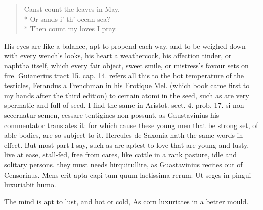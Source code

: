 {\begin{verse}
Canst count the leaves in May,\\*
Or sands i' th' ocean sea?\\*
Then count my loves I pray.
\end{verse}

His eyes are like a balance, apt to propend each way, and to be weighed
down with every wench's looks, his heart a weathercock, his affection
tinder, or naphtha itself, which every fair object, sweet smile, or
mistress's favour sets on fire. Guianerius tract 15. cap. 14. refers
all this to the hot temperature of the testicles, Ferandus a
Frenchman in his Erotique Mel. (which book came first to my hands
after the third edition) to certain atomi in the seed, such as are very
spermatic and full of seed. I find the same in Aristot. sect. 4. prob.
17. si non secernatur semen, cessare tentigines non possunt, as
Gaustavinius his commentator translates it: for which cause these young
men that be strong set, of able bodies, are so subject to it. Hercules
de Saxonia hath the same words in effect. But most part I say, such as
are aptest to love that are young and lusty, live at ease, stall-fed,
free from cares, like cattle in a rank pasture, idle and solitary
persons, they must needs hirquitullire, as Guastavinius recites out of
Censorinus.
Mens erit apta capi tum quum laetissima rerum.
Ut seges in pingui luxuriabit humo.

The mind is apt to lust, and hot or cold,
As corn luxuriates in a better mould.

}
